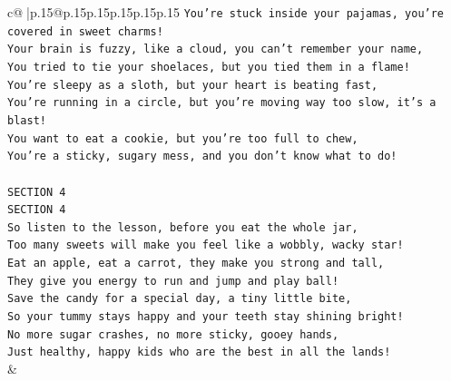 \documentclass{article}
\begin{document}
{\begin{supertabular}{c@{$\;$}|p{.15\linewidth}@{}p{.15\linewidth}p{.15\linewidth}p{.15\linewidth}p{.15\linewidth}p{.15\linewidth}}
{{{\texttt{You're stuck inside your pajamas, you're covered in sweet charms!} \\
\texttt{Your brain is fuzzy, like a cloud, you can't remember your name,} \\
\texttt{You tried to tie your shoelaces, but you tied them in a flame!} \\
\texttt{You're sleepy as a sloth, but your heart is beating fast,} \\
\texttt{You're running in a circle, but you're moving way too slow, it's a blast!} \\
\texttt{You want to eat a cookie, but you're too full to chew,} \\
\texttt{You're a sticky, sugary mess, and you don't know what to do!} \\
\\ 
\texttt{SECTION 4} \\
\texttt{SECTION 4} \\
\texttt{So listen to the lesson, before you eat the whole jar,} \\
\texttt{Too many sweets will make you feel like a wobbly, wacky star!} \\
\texttt{Eat an apple, eat a carrot, they make you strong and tall,} \\
\texttt{They give you energy to run and jump and play ball!} \\
\texttt{Save the candy for a special day, a tiny little bite,} \\
\texttt{So your tummy stays happy and your teeth stay shining bright!} \\
\texttt{No more sugar crashes, no more sticky, gooey hands,} \\
\texttt{Just healthy, happy kids who are the best in all the lands!} \\
            }
        }
    }
    & \\ \\


\end{supertabular}}
\end{document}
